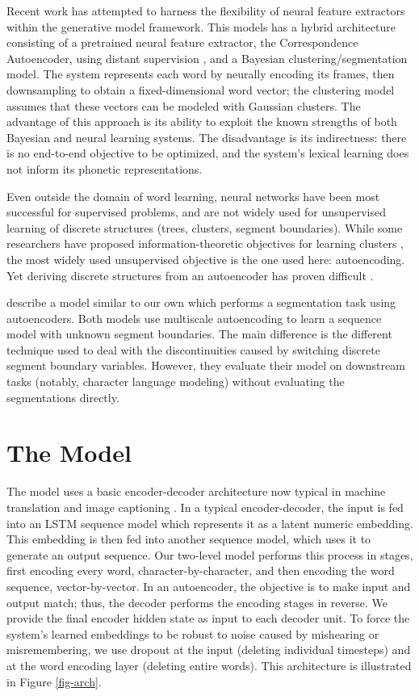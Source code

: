 \documentclass[11pt,letterpaper]{article}
\begin{document}
Recent work \cite{Kamper16} has attempted to harness the flexibility
of neural feature extractors within the generative model
framework. This models has a hybrid architecture consisting of a
pretrained neural feature extractor, the Correspondence Autoencoder,
using distant supervision \cite{Kamper15}, and a Bayesian
clustering/segmentation model. The system represents each word by
neurally encoding its frames, then downsampling to obtain a
fixed-dimensional word vector; the clustering model assumes that these
vectors can be modeled with Gaussian clusters. The advantage of this
approach is its ability to exploit the known strengths of both
Bayesian and neural learning systems. The disadvantage is its
indirectness: there is no end-to-end objective to be optimized, and
the system's lexical learning does not inform its phonetic
representations.

Even outside the domain of word learning, neural networks have been
most successful for supervised problems, and are not widely used for
unsupervised learning of discrete structures (trees, clusters, segment
boundaries). While some researchers have proposed
information-theoretic objectives for learning clusters
\cite{Klapper01}, the most widely used unsupervised objective is the
one used here: autoencoding. Yet deriving discrete structures from an
autoencoder has proven difficult \cite{has-anyone-done-it}.

 describe a model similar to our own which performs a
segmentation task using autoencoders. Both models use multiscale
autoencoding to learn a sequence model with unknown segment
boundaries. The main difference is the different technique used to
deal with the discontinuities caused by switching discrete segment
boundary variables. However, they evaluate their model on downstream
tasks (notably, character language modeling) without evaluating the
segmentations directly.

\section{The Model}

The model uses a basic encoder-decoder architecture now typical in
machine translation \cite{Cho14} and image captioning
\cite{Vinyals15}. In a typical encoder-decoder, the input is fed into
an LSTM sequence model \cite{Hochreiter97} which represents it as a
latent numeric embedding. This embedding is then fed into another
sequence model, which uses it to generate an output sequence. Our
two-level model performs this process in stages, first encoding every
word, character-by-character, and then encoding the word sequence,
vector-by-vector. In an autoencoder, the objective is to make input
and output match; thus, the decoder performs the encoding stages in
reverse. We provide the final encoder hidden state as input to each
decoder unit. To force the system's learned embeddings to be robust to
noise caused by mishearing or misremembering, we use dropout
\cite{Srivastava14} at the input (deleting individual timesteps) and
at the word encoding layer (deleting entire words). This architecture
is illustrated in Figure \ref{fig-arch}.
\end{document}
